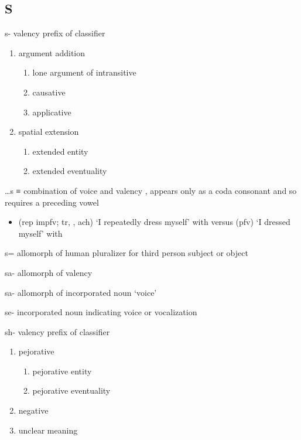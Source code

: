 \subsection{S}\label{sec:alphalist-s}
\begin{morphdesc}[resume*=alphalist]
\item[s-]\label{m:s-}
	valency prefix of classifier
	\begin{enumerate}
	\item	argument addition
		\begin{enumerate}
		\item	lone argument of intransitive
		\item	causative
		\item	applicative
		\end{enumerate}
	\item	spatial extension
		\begin{enumerate}
		\item	extended entity
		\item	extended eventuality
		\end{enumerate}
	\end{enumerate}

\item[…s]\label{m:…s}
	≡ 
	combination of voice 
		and valency ,
	appears only as a coda consonant and so requires a preceding vowel
	\begin{itemize}
	\item	{} (rep impfv; tr, , ach) ‘I repeatedly dress myself’
			with \newline
		versus  (pfv) ‘I dressed myself’
			with 
	\end{itemize}

\item[s=]
	allomorph of human pluralizer  for third person subject or object

\item[sa-]\label{m:sa-val}
	allomorph of valency 

\item[sa-]\label{m:sa-voice}
	allomorph of incorporated noun  ‘voice’

\item[se-]\label{m:se-}
	incorporated noun indicating voice or vocalization

\item[sh-]\label{m:sh-}
	valency prefix of classifier
	\begin{enumerate}
	\item	pejorative
		\begin{enumerate}
		\item	pejorative entity
		\item	pejorative eventuality
		\end{enumerate}
	\item	negative
	\item	unclear meaning
	\end{enumerate}


\end{morphdesc}

